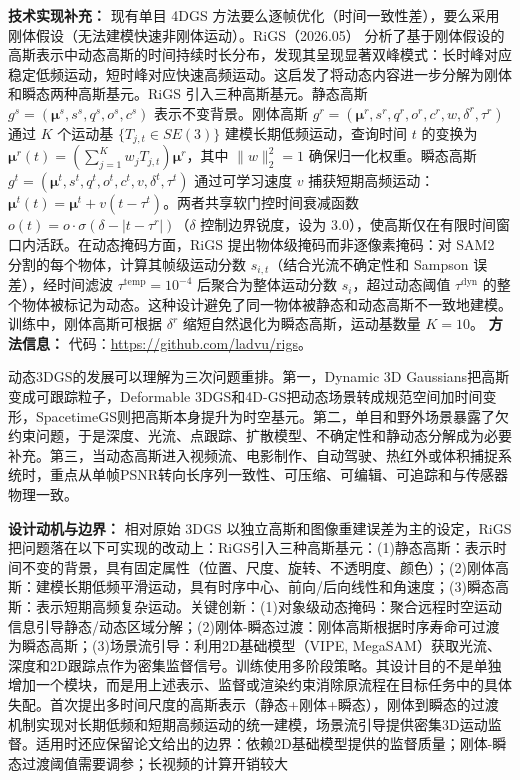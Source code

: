 \textbf{技术实现补充：} 现有单目 4DGS 方法要么逐帧优化（时间一致性差），要么采用刚体假设（无法建模快速非刚体运动）。RiGS（2026.05） 分析了基于刚体假设的高斯表示中动态高斯的时间持续时长分布，发现其呈现显著双峰模式：长时峰对应稳定低频运动，短时峰对应快速高频运动。这启发了将动态内容进一步分解为刚体和瞬态两种高斯基元。RiGS 引入三种高斯基元。静态高斯 $g^s = (\boldsymbol{\mu}^s, s^s, q^s, o^s, c^s)$ 表示不变背景。刚体高斯 $g^r = (\boldsymbol{\mu}^r, s^r, q^r, o^r, c^r, w, \delta^r, \tau^r)$ 通过 $K$ 个运动基 $\{T_{j,t} \in SE(3)\}$ 建模长期低频运动，查询时间 $t$ 的变换为 $\boldsymbol{\mu}^r(t) = (\sum_{j=1}^{K}w_j T_{j,t})\boldsymbol{\mu}^r$，其中 $\|w\|_2^2=1$ 确保归一化权重。瞬态高斯 $g^t = (\boldsymbol{\mu}^t, s^t, q^t, o^t, c^t, v, \delta^t, \tau^t)$ 通过可学习速度 $v$ 捕获短期高频运动：$\boldsymbol{\mu}^t(t) = \boldsymbol{\mu}^t + v(t - \tau^t)$。两者共享软门控时间衰减函数 $o(t) = o \cdot \sigma(\delta - |t - \tau^r|)$（$\delta$ 控制边界锐度，设为 3.0），使高斯仅在有限时间窗口内活跃。在动态掩码方面，RiGS 提出物体级掩码而非逐像素掩码：对 SAM2 分割的每个物体，计算其帧级运动分数 $s_{i,t}$（结合光流不确定性和 Sampson 误差），经时间滤波 $\tau^{\mathrm{temp}} = 10^{-4}$ 后聚合为整体运动分数 $s_i$，超过动态阈值 $\tau^{\mathrm{dyn}}$ 的整个物体被标记为动态。这种设计避免了同一物体被静态和动态高斯不一致地建模。训练中，刚体高斯可根据 $\delta^r$ 缩短自然退化为瞬态高斯，运动基数量 $K=10$。
\textbf{方法信息：} 代码：\url{https://github.com/ladvu/rigs}。

\begin{takeaway}
动态3DGS的发展可以理解为三次问题重排。第一，Dynamic 3D Gaussians把高斯变成可跟踪粒子，Deformable 3DGS和4D-GS把动态场景转成规范空间加时间变形，SpacetimeGS则把高斯本身提升为时空基元。第二，单目和野外场景暴露了欠约束问题，于是深度、光流、点跟踪、扩散模型、不确定性和静动态分解成为必要补充。第三，当动态高斯进入视频流、电影制作、自动驾驶、热红外或体积捕捉系统时，重点从单帧PSNR转向长序列一致性、可压缩、可编辑、可追踪和与传感器物理一致。
\end{takeaway}
\textbf{设计动机与边界：} 相对原始 3DGS 以独立高斯和图像重建误差为主的设定，RiGS 把问题落在以下可实现的改动上：RiGS引入三种高斯基元：(1)静态高斯：表示时间不变的背景，具有固定属性（位置、尺度、旋转、不透明度、颜色）；(2)刚体高斯：建模长期低频平滑运动，具有时序中心、前向/后向线性和角速度；(3)瞬态高斯：表示短期高频复杂运动。关键创新：(1)对象级动态掩码：聚合远程时空运动信息引导静态/动态区域分解；(2)刚体-瞬态过渡：刚体高斯根据时序寿命可过渡为瞬态高斯；(3)场景流引导：利用2D基础模型（VIPE, MegaSAM）获取光流、深度和2D跟踪点作为密集监督信号。训练使用多阶段策略。其设计目的不是单独增加一个模块，而是用上述表示、监督或渲染约束消除原流程在目标任务中的具体失配。首次提出多时间尺度的高斯表示（静态+刚体+瞬态），刚体到瞬态的过渡机制实现对长期低频和短期高频运动的统一建模，场景流引导提供密集3D运动监督。适用时还应保留论文给出的边界：依赖2D基础模型提供的监督质量；刚体-瞬态过渡阈值需要调参；长视频的计算开销较大

